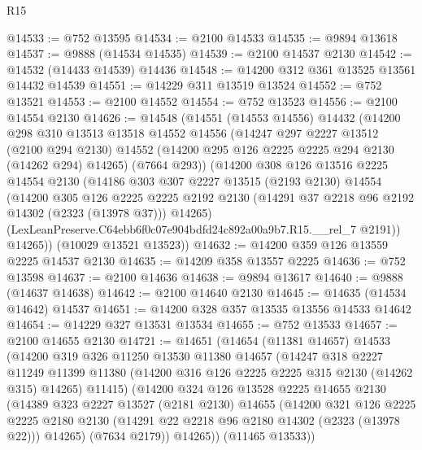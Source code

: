 \begin{lexlean}{R15}
\begin{coremodule}
@14533 := @752 @13595
@14534 := @2100 @14533
@14535 := @9894 @13618
@14537 := @9888 (@14534 @14535)
@14539 := @2100 @14537 @2130
@14542 := @14532 (@14433 @14539) @14436
@14548 := @14200 @312 @361 @13525 @13561 @14432 @14539
@14551 := @14229 @311 @13519 @13524
@14552 := @752 @13521
@14553 := @2100 @14552
@14554 := @752 @13523
@14556 := @2100 @14554 @2130
@14626 := @14548
    (@14551
      (@14553 @14556)
      @14432
      (@14200
        @298
        @310
        @13513
        @13518
        @14552
        @14556
        (@14247
          @297
          @2227
          @13512
          (@2100 @294 @2130)
          @14552
          (@14200 @295 @126 @2225 @2225 @294 @2130 (@14262 @294) @14265)
          (@7664 @293))
        (@14200
          @308
          @126
          @13516
          @2225
          @14554
          @2130
          (@14186
            @303
            @307
            @2227
            @13515
            (@2193 @2130)
            @14554
            (@14200
              @305
              @126
              @2225
              @2225
              @2192
              @2130
              (@14291 @37 @2218 @96 @2192 @14302 (@2323 (@13978 @37)))
              @14265)
            (LexLeanPreserve.C64ebb6f0c07e904bdfd24c892a00a9b7.R15.__rel_7 @2191))
          @14265))
      (@10029 @13521 @13523))
@14632 := @14200 @359 @126 @13559 @2225 @14537 @2130
@14635 := @14209 @358 @13557 @2225
@14636 := @752 @13598
@14637 := @2100 @14636
@14638 := @9894 @13617
@14640 := @9888 (@14637 @14638)
@14642 := @2100 @14640 @2130
@14645 := @14635 (@14534 @14642) @14537
@14651 := @14200 @328 @357 @13535 @13556 @14533 @14642
@14654 := @14229 @327 @13531 @13534
@14655 := @752 @13533
@14657 := @2100 @14655 @2130
@14721 := @14651
    (@14654
      (@11381 @14657)
      @14533
      (@14200
        @319
        @326
        @11250
        @13530
        @11380
        @14657
        (@14247
          @318
          @2227
          @11249
          @11399
          @11380
          (@14200 @316 @126 @2225 @2225 @315 @2130 (@14262 @315) @14265)
          @11415)
        (@14200
          @324
          @126
          @13528
          @2225
          @14655
          @2130
          (@14389
            @323
            @2227
            @13527
            (@2181 @2130)
            @14655
            (@14200
              @321
              @126
              @2225
              @2225
              @2180
              @2130
              (@14291 @22 @2218 @96 @2180 @14302 (@2323 (@13978 @22)))
              @14265)
            (@7634 @2179))
          @14265))
      (@11465 @13533))

\end{coremodule}
\end{lexlean}
